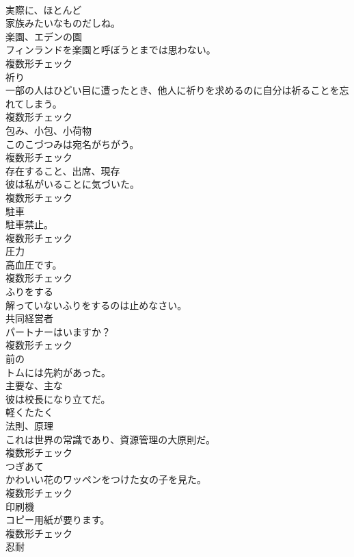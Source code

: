 \documentclass[8pt]{extreport}
\begin{document}
\begin{CJK}{UTF8}{min}
\\	[副詞]	実際に、ほとんど	
\\	家族みたいなものだしね。	
\\	[名詞]	楽園、エデンの園	
\\	フィンランドを楽園と呼ぼうとまでは思わない。	
\\	複数形チェック
\\	[名詞]	祈り	
\\	一部の人はひどい目に遭ったとき、他人に祈りを求めるのに自分は祈ることを忘れてしまう。	
\\	複数形チェック
\\	[名詞]	包み、小包、小荷物	
\\	このこづつみは宛名がちがう。	
\\	複数形チェック
\\	[名詞]	存在すること、出席、現存	
\\	彼は私がいることに気づいた。	
\\	複数形チェック
\\	[名詞]	駐車	
\\	駐車禁止。	
\\	複数形チェック
\\	[名詞]	圧力	
\\	高血圧です。	
\\	複数形チェック
\\	[動詞]	ふりをする	
\\	解っていないふりをするのは止めなさい。	
\\	[名詞]	共同経営者	
\\	パートナーはいますか？	
\\	複数形チェック
\\	[形容詞]	前の	
\\	トムには先約があった。	
\\	[形容詞]	主要な、主な	
\\	彼は校長になり立てだ。	
\\	[動詞]	軽くたたく	
\\	[名詞]	法則、原理	
\\	これは世界の常識であり、資源管理の大原則だ。	
\\	複数形チェック
\\	[名詞]	つぎあて	
\\	かわいい花のワッペンをつけた女の子を見た。	
\\	複数形チェック
\\	[名詞]	印刷機	
\\	コピー用紙が要ります。	
\\	複数形チェック
\\	[名詞]	忍耐	

\end{CJK}
\end{document}
